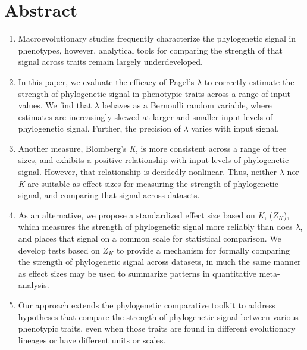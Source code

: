 \documentclass[
]{article}
\begin{document}
\newpage

\setcounter{section}{0}

\hypertarget{abstract}{%
\section*{Abstract}\label{abstract}}

\begin{enumerate}
\def\labelenumi{\arabic{enumi}.}
\item
  Macroevolutionary studies frequently characterize the phylogenetic
  signal in phenotypes, however, analytical tools for comparing the
  strength of that signal across traits remain largely underdeveloped.
\item
  In this paper, we evaluate the efficacy of Pagel's \(\lambda\) to
  correctly estimate the strength of phylogenetic signal in phenotypic
  traits across a range of input values. We find that \(\lambda\)
  behaves as a Bernoulli random variable, where estimates are
  increasingly skewed at larger and smaller input levels of phylogenetic
  signal. Further, the precision of \(\lambda\) varies with input
  signal.
\item
  Another measure, Blomberg's \emph{K}, is more consistent across a
  range of tree sizes, and exhibits a positive relationship with input
  levels of phylogenetic signal. However, that relationship is decidedly
  nonlinear. Thus, neither \(\lambda\) nor \emph{K} are suitable as
  effect sizes for measuring the strength of phylogenetic signal, and
  comparing that signal across datasets.
\item
  As an alternative, we propose a standardized effect size based on
  \emph{K}, (\(Z_K\)), which measures the strength of phylogenetic
  signal more reliably than does \(\lambda\), and places that signal on
  a common scale for statistical comparison. We develop tests based on
  \(Z_K\) to provide a mechanism for formally comparing the strength of
  phylogenetic signal across datasets, in much the same manner as effect
  sizes may be used to summarize patterns in quantitative meta-analysis.
\item
  Our approach extends the phylogenetic comparative toolkit to address
  hypotheses that compare the strength of phylogenetic signal between
  various phenotypic traits, even when those traits are found in
  different evolutionary lineages or have different units or scales.
\end{enumerate}
\end{document}
